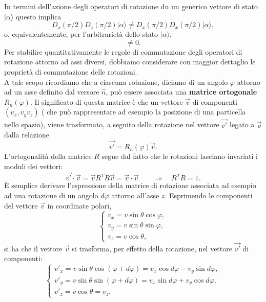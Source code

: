 In termini dell'azione degli operatori di rotazione du un generico vettore di stato $\vert \alpha \rangle$ questo implica
\begin{equation}
D_x (\pi/2) D_z (\pi/2) \vert \alpha \rangle \neq D_x (\pi/2) D_x (\pi/2) \vert \alpha \rangle ,
\end{equation}
o, equivalentemente, per l'arbitrarietà dello stato $\vert \alpha \rangle$,
\begin{equation}
[D_x (\pi/2); D_z (\pi/2)] \neq 0 .
\end{equation}
Per stabilire quantitativamente le regole di commutazione degli operatori di rotazione attorno ad assi diversi, dobbiamo considerare con maggior dettaglio le proprietà di commutazione delle rotazioni.\\
A tale scopo ricordiamo che a ciascuna rotazione, diciamo di un angolo $\varphi$ attorno ad un asse definito dal versore $\widehat{n}$, può essere associata una \textbf{matrice ortogonale} $R_{\widehat{n}} (\varphi)$. Il significato di questa matrice è che un vettore $\vec{v}$ di componenti $(v_x, v_y v_z) $ ( che può rappresentare ad esempio la posizione di una particella nello spazio), viene trasformato, a seguito della rotazione nel vettore $\vec{v'}$ legato a $\vec{v}$ dalla relazione
\begin{equation}
\vec{v'}= R_{\widehat{n}} (\varphi)\vec{v}.
\end{equation}
L'ortogonalità della matrice $R$ segue dal fatto che le rotazioni lasciano invariati i moduli dei vettori:
\begin{equation}
\vec{v'}\cdot\vec{v} = \vec{v}R^T R \vec{v}= \vec{v}\cdot\vec{v} \qquad \Rightarrow \quad
 R^T R =1.
\end{equation}
È semplice derivare l'espressione della matrice di rotazione associata ad esempio ad una rotazione di un angolo $d\varphi $ attorno all'asse $z$. Esprimendo le componenti del vettore $\vec{v}$ in coordinate polari,
\begin{equation}
\begin{cases}
v_x = v \sin\theta \cos \varphi ,\\
v_y = v \sin\theta \sin \varphi ,\\
v_z = v \cos\theta ,
\end{cases}
\end{equation}
si ha che il vettore $\vec{v}$ si trasforma, per effetto della rotazione, nel vettore $\vec{v'}$ di componenti:
\begin{equation}
\begin{cases}
v'_x = v \sin\theta \cos (\varphi +d\varphi )= v_x \cos d\varphi - v_y \sin d\varphi ,\\
v'_y = v \sin\theta \sin (\varphi +d\varphi ) = v_x \sin d\varphi + v_y \cos d\varphi ,\\
v'_z = v \cos\theta = v_z .
\end{cases}
\end{equation}
